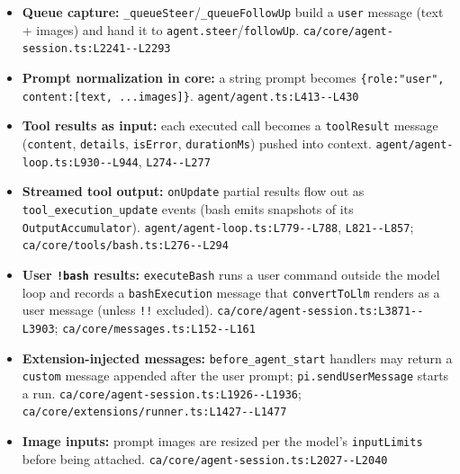 \begin{itemize}
\item \textbf{Queue capture:} \texttt{\_\allowbreak{}queueSteer}/\texttt{\_\allowbreak{}queueFollowUp} build a \texttt{user} message (text + images) and hand it to \texttt{agent.\allowbreak{}steer}/\texttt{followUp}. \texttt{ca/\allowbreak{}core/\allowbreak{}agent-\allowbreak{}session.\allowbreak{}ts:\allowbreak{}L2241-\allowbreak{}-\allowbreak{}L2293}
\item \textbf{Prompt normalization in core:} a string prompt becomes \texttt{\{role:\allowbreak{}"user", content:\allowbreak{}[text, .\allowbreak{}.\allowbreak{}.\allowbreak{}images]\}}. \texttt{agent/\allowbreak{}agent.\allowbreak{}ts:\allowbreak{}L413-\allowbreak{}-\allowbreak{}L430}
\item \textbf{Tool results as input:} each executed call becomes a \texttt{toolResult} message (\texttt{content}, \texttt{details}, \texttt{isError}, \texttt{durationMs}) pushed into context. \texttt{agent/\allowbreak{}agent-\allowbreak{}loop.\allowbreak{}ts:\allowbreak{}L930-\allowbreak{}-\allowbreak{}L944}, \texttt{L274-\allowbreak{}-\allowbreak{}L277}
\item \textbf{Streamed tool output:} \texttt{onUpdate} partial results flow out as \texttt{tool\_\allowbreak{}execution\_\allowbreak{}update} events (bash emits snapshots of its \texttt{OutputAccumulator}). \texttt{agent/\allowbreak{}agent-\allowbreak{}loop.\allowbreak{}ts:\allowbreak{}L779-\allowbreak{}-\allowbreak{}L788}, \texttt{L821-\allowbreak{}-\allowbreak{}L857}; \texttt{ca/\allowbreak{}core/\allowbreak{}tools/\allowbreak{}bash.\allowbreak{}ts:\allowbreak{}L276-\allowbreak{}-\allowbreak{}L294}
\item \textbf{User \texttt{!bash} results:} \texttt{executeBash} runs a user command outside the model loop and records a \texttt{bashExecution} message that \texttt{convertToLlm} renders as a user message (unless \texttt{!!} excluded). \texttt{ca/\allowbreak{}core/\allowbreak{}agent-\allowbreak{}session.\allowbreak{}ts:\allowbreak{}L3871-\allowbreak{}-\allowbreak{}L3903}; \texttt{ca/\allowbreak{}core/\allowbreak{}messages.\allowbreak{}ts:\allowbreak{}L152-\allowbreak{}-\allowbreak{}L161}
\item \textbf{Extension-injected messages:} \texttt{before\_\allowbreak{}agent\_\allowbreak{}start} handlers may return a \texttt{custom} message appended after the user prompt; \texttt{pi.\allowbreak{}sendUserMessage} starts a run. \texttt{ca/\allowbreak{}core/\allowbreak{}agent-\allowbreak{}session.\allowbreak{}ts:\allowbreak{}L1926-\allowbreak{}-\allowbreak{}L1936}; \texttt{ca/\allowbreak{}core/\allowbreak{}extensions/\allowbreak{}runner.\allowbreak{}ts:\allowbreak{}L1427-\allowbreak{}-\allowbreak{}L1477}
\item \textbf{Image inputs:} prompt images are resized per the model's \texttt{inputLimits} before being attached. \texttt{ca/\allowbreak{}core/\allowbreak{}agent-\allowbreak{}session.\allowbreak{}ts:\allowbreak{}L2027-\allowbreak{}-\allowbreak{}L2040}
\end{itemize}

